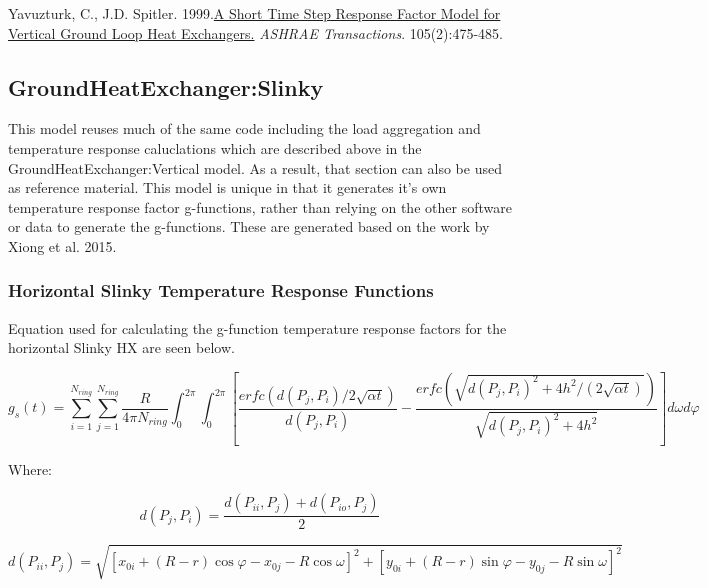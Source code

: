 Yavuzturk, C., J.D. Spitler. 1999.\href{http://www.hvac.okstate.edu/research/Documents/ASHRAE/Yavuzturk_Spitler_99.pdf}{A Short Time Step Response Factor Model for Vertical Ground Loop Heat Exchangers.} \emph{ASHRAE Transactions}. 105(2):475-485.

\subsection{GroundHeatExchanger:Slinky}\label{groundheatexchangerslinky}

This model reuses much of the same code including the load aggregation and temperature response caluclations which are described above in the GroundHeatExchanger:Vertical model. As a result, that section can also be used as reference material. This model is unique in that it generates it's own temperature response factor g-functions, rather than relying on the other software or data to generate the g-functions. These are generated based on the work by Xiong et al. 2015.

\subsubsection{Horizontal Slinky Temperature Response Functions}\label{horizontal-slinky-temperature-response-functions}

Equation used for calculating the g-function temperature response factors for the horizontal Slinky HX are seen below.

\begin{equation}
g_s\left(t\right) = \sum_{i = 1}^{N_{ring}} \sum_{j = 1}^{N_{ring}} \frac{R}{4\pi N_{ring}} \int_0^{2\pi} \int_0^{2\pi} 
            \left[ 
                \frac{erfc\left(d\left(P_j,P_i\right)/2\sqrt{\alpha t}\right)}{d\left(P_j,P_i\right)} - 
                \frac{erfc\left(\sqrt{d\left(P_j,P_i\right)^2+4h^2/\left(2\sqrt{\alpha t}\right)}\right)}{\sqrt{d\left(P_j,P_i\right)^2+4h^2} }
            \right]d\omega d\varphi
\end{equation}

Where:

\begin{equation}
d\left(P_j,P_i\right) = \frac{d\left(P_{ii},P_j\right) + d\left(P_{io},P_j\right)}{2}
\end{equation}

\begin{equation}
d\left(P_{ii},P_j\right) = \sqrt{\left[x_{0i} + \left(R-r\right)\cos \varphi - x_{0j}-R\cos \omega\right]^2 + \left[y_{0i} + \left(R-r\right)\sin \varphi - y_{0j}-R\sin \omega\right]^2}
\end{equation}

